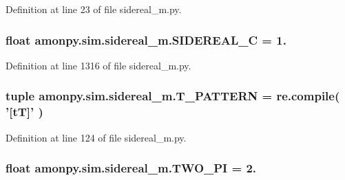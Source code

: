 Definition at line 23 of file sidereal\-\_\-m.\-py.

\hypertarget{namespaceamonpy_1_1sim_1_1sidereal__m_a5fd5697d2163323b9ecd8d2865fcda6c}{
\subsubsection[{S\-I\-D\-E\-R\-E\-A\-L\-\_\-\-C}]{\setlength{\rightskip}{0pt plus 5cm}float amonpy.\-sim.\-sidereal\-\_\-m.\-S\-I\-D\-E\-R\-E\-A\-L\-\_\-\-C = 1.}}\label{namespaceamonpy_1_1sim_1_1sidereal__m_a5fd5697d2163323b9ecd8d2865fcda6c}


Definition at line 1316 of file sidereal\-\_\-m.\-py.

\hypertarget{namespaceamonpy_1_1sim_1_1sidereal__m_a8005eb0af38a9506bd011904bffd057a}{
\subsubsection[{T\-\_\-\-P\-A\-T\-T\-E\-R\-N}]{\setlength{\rightskip}{0pt plus 5cm}tuple amonpy.\-sim.\-sidereal\-\_\-m.\-T\-\_\-\-P\-A\-T\-T\-E\-R\-N = re.\-compile( '\mbox{[}t\-T\mbox{]}' )}}\label{namespaceamonpy_1_1sim_1_1sidereal__m_a8005eb0af38a9506bd011904bffd057a}


Definition at line 124 of file sidereal\-\_\-m.\-py.

\hypertarget{namespaceamonpy_1_1sim_1_1sidereal__m_ae23ecb23e3a043f3851b30c42cb9aa5c}{
\subsubsection[{T\-W\-O\-\_\-\-P\-I}]{\setlength{\rightskip}{0pt plus 5cm}float amonpy.\-sim.\-sidereal\-\_\-m.\-T\-W\-O\-\_\-\-P\-I = 2.}}\label{namespaceamonpy_1_1sim_1_1sidereal__m_ae23ecb23e3a043f3851b30c42cb9aa5c}


